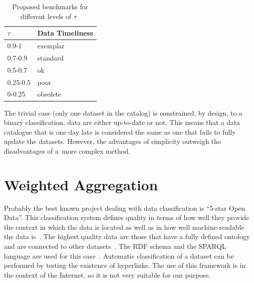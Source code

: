 \begin{table}[htbp]
    \centering

    \begin{tabular}{@{}ll@{}}
        \toprule
        \( \tau \)  & Data Timeliness   \\ \midrule
        0.9-1       & exemplar          \\
        0.7-0.9     & standard          \\
        0.5-0.7     & ok                \\
        0.25-0.5    & poor              \\
        0-0.25      & obsolete          \\
        \bottomrule
    \end{tabular}

    \caption{Proposed benchmarks for different levels of \( \tau \)~\cite{atz2014tau}}
    \label{table:timeliness-benchmarks}
\end{table}
\FloatBarrier

The trivial case (only one dataset in the catalog) is constrained, by design, to a binary classification, data are either up-to-date or not.
This means that a data catalogue that is one day late is considered the same as one that fails to fully update the datasets.
However, the advantages of simplicity outweigh the disadvantages of a~more complex method.

\section{Weighted Aggregation}

Probably the best known project dealing with data classification is \enquote{5-star Open Data}.
This classification system defines quality in terms of how well they provide the context in which the data is located as well as in how well machine-readable the data is~\cite{w3org5stardata}.
The highest quality data are those that have a fully defined ontology and are connected to other datasets~\cite{5stardata}.
The RDF schema and the SPARQL language are used for this case~\cite{5stardata}.
Automatic classification of a dataset can be performed by testing the existence of hyperlinks.
The use of this framework is in the context of the Internet, so it is not very suitable for our purpose.

